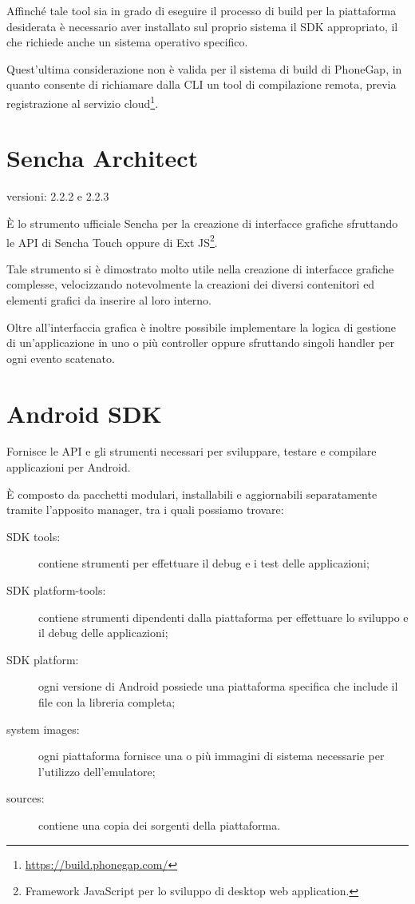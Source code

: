 Affinché tale tool sia in grado di eseguire il processo di build per la piattaforma desiderata è necessario aver installato sul proprio sistema il \ac{SDK} appropriato, il che richiede anche un sistema operativo specifico.

Quest'ultima considerazione non è valida per il sistema di build di PhoneGap, in quanto consente di richiamare dalla \ac{CLI} un tool di compilazione remota, previa registrazione al servizio cloud\footnote{\url{https://build.phonegap.com/}}.

\section{Sencha Architect}
\begin{description}
\item[versioni: 2.2.2 e 2.2.3]
\end{description}

È lo strumento ufficiale Sencha per la creazione di interfacce grafiche sfruttando le \ac{API} di Sencha Touch oppure di Ext JS\footnote{Framework JavaScript per lo  sviluppo di desktop web application.}.

Tale strumento si è dimostrato molto utile nella creazione di interfacce grafiche complesse, velocizzando notevolmente la creazioni dei diversi contenitori ed elementi grafici da inserire al loro interno.

Oltre all'interfaccia grafica è inoltre possibile implementare la logica di gestione di un'applicazione in uno o più controller oppure sfruttando singoli handler per ogni evento scatenato.

\section{Android SDK}
Fornisce le \ac{API} e gli strumenti necessari per sviluppare, testare e compilare applicazioni per Android.

È composto da pacchetti modulari, installabili e aggiornabili separatamente tramite l'apposito manager, tra i quali possiamo trovare:
\begin{description}
\item[SDK tools:] contiene strumenti per effettuare il debug e i test delle applicazioni;
\item[SDK platform-tools:] contiene strumenti dipendenti dalla piattaforma per effettuare lo sviluppo e il debug delle applicazioni;
\item[SDK platform:] ogni versione di Android possiede una piattaforma specifica che include il file  con la libreria completa;
\item[system images:] ogni piattaforma fornisce una o più immagini di sistema necessarie per l'utilizzo dell'emulatore;
\item[sources:] contiene una copia dei sorgenti della piattaforma.
\end{description}

